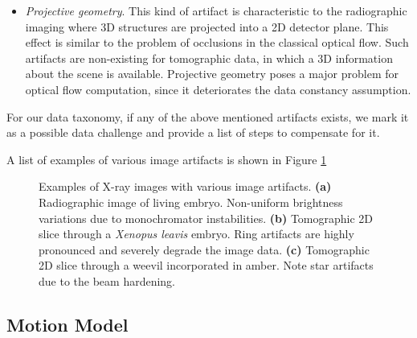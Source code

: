 \begin{itemize}
	\item \textit{Projective geometry}. This kind of artifact is characteristic to the radiographic imaging where 3D structures are projected into a 2D detector plane. This effect is similar to the problem of occlusions in the classical optical flow. Such artifacts are non-existing for tomographic data, in which a 3D information about the scene is available. Projective geometry poses a major problem for optical flow computation, since it deteriorates the data constancy assumption.
\end{itemize}

For our data taxonomy, if any of the above mentioned artifacts exists, we mark it as a possible data challenge and provide a list of steps to compensate for it.

%	

A list of examples of various image artifacts is shown in Figure \ref{fig:artifacts_examples}

\begin{figure}[ht]
	
	\centerline{
		\mbox{}
		\mbox{}
		\mbox{}
	} 
	\caption[]{Examples of X-ray images with various image artifacts. \textbf{(a)} Radiographic image of living embryo. Non-uniform brightness variations due to monochromator instabilities. \textbf{(b)} Tomographic 2D slice through a \textit{Xenopus leavis} embryo. Ring artifacts are highly pronounced and severely degrade the image data. \textbf{(c)} Tomographic 2D slice through a weevil incorporated in amber. Note star artifacts due to the beam hardening.}
	\label{fig:artifacts_examples}
\end{figure}




\subsection{Motion Model}

